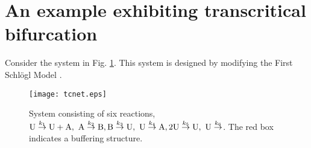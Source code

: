 \documentclass[ amsmath,amssymb,nofootinbib
]{revtex4-1}
\def\bal#1\eal{\begin{align}#1\end{align}}
\def\mbf#1{\mbox{\boldmath $#1$}}
\newcommand{\non}{\nonumber}
\begin{document}
\section{An example exhibiting transcritical bifurcation}
Consider the system in Fig. \ref{fig:tc}. This system is designed by modifying the First Schl\"ogl Model \cite{schlogl}.
\begin{figure}[t]
\center
\texttt{[image: tcnet.eps]}
\caption{System consisting of six reactions, ${\rm U}  \overset{k_1}{\rightarrow }  {\rm U+ A} , \ {\rm A}\overset{k_2}{\rightarrow } {\rm B},
{\rm B} \overset{k_3}{\rightarrow }{\rm U},\  {\rm U}\overset{k_4}{\rightarrow }{\rm A},
2 {\rm U} \overset{k_5}{\rightarrow}  {\rm U},  \ {\rm  U} \overset{k_6}{\rightarrow}$.
The red box indicates a buffering structure. }
\label{fig:tc}
\end{figure}
\end{document}
